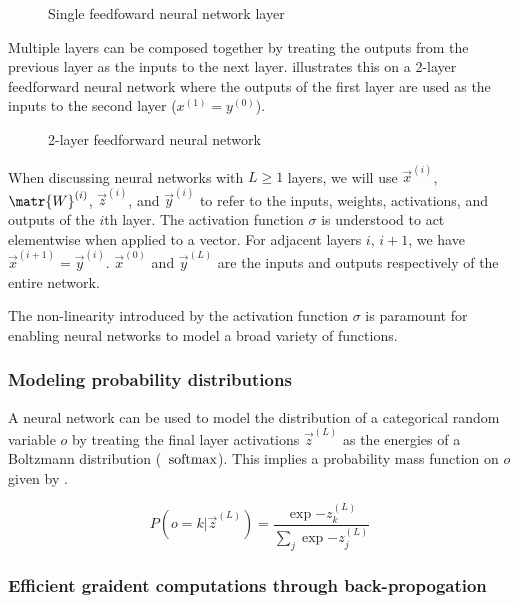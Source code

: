 \begin{figure}[tb]
    \centering
    
    \caption{Single feedfoward neural network layer}
    \label{fig:nn-layer}
\end{figure}

Multiple layers can be composed together by treating the outputs from the previous layer
as the inputs to the next layer.  illustrates this on a 2-layer
feedforward neural network where the outputs of the first layer are used as the
inputs to the second layer (\ie $x^{(1)} = y^{(0)}$).


\begin{figure}[htbp]
    \centering
    
    \caption{2-layer feedforward neural network}
    \label{fig:ffw-nn}
\end{figure}

When discussing neural networks with $L \geq 1$ layers, we will use
$\vec{x}^{(i)}$, $\matr{W}^{(i)}$, $\vec{z}^{(i)}$, and $\vec{y}^{(i)}$ to
refer to the inputs, weights, activations, and outputs of the $i$th layer. The
activation function $\sigma$ is understood to act elementwise when applied to a
vector. For adjacent layers $i$, $i+1$, we have $\vec{x}^{(i+1)} =
\vec{y}^{(i)}$. $\vec{x}^{(0)}$ and $\vec{y}^{(L)}$ are the inputs and outputs
respectively of the entire network.

The non-linearity introduced by the activation function $\sigma$ is paramount
for enabling neural networks to model a broad variety of functions. 

\subsubsection{Modeling probability distributions}

A neural network can be used to model the distribution of a categorical random
variable $o$ by treating the final layer activations $\vec{z}^{(L)}$ as the
energies of a Boltzmann distribution (\ie\ $\operatorname*{softmax}$). This implies a
probability mass function on $o$ given by .

\begin{equation}
    \label{eq:softmax}
    P(o = k | \vec{z}^{(L)}) = \frac{\exp{-z^{(L)}_k}}{ \sum_{j} \exp{-z^{(L)}_j} }
\end{equation}

\subsubsection{Efficient graident computations through back-propogation}

